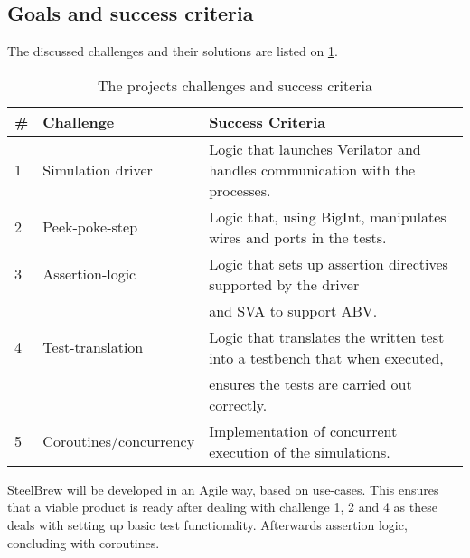 \subsection{Goals and success criteria}
The discussed challenges and their solutions are listed on \cref{tbl:criteria}.
\begin{table}[H]
    \centering
    \caption{The projects challenges and success criteria}\label{tbl:criteria}
    \begin{tabular}{lll}
        \toprule
        \# & Challenge              & Success Criteria                                                            \\
        \midrule
        1  & Simulation driver      & Logic that launches Verilator and handles communication with the processes. \\
        2  & Peek-poke-step         & Logic that, using BigInt, manipulates wires and ports in the tests.         \\
        3  & Assertion-logic        & Logic that sets up assertion directives supported by the driver             \\
           &                        & and SVA to support ABV.                                                     \\
        4  & Test-translation       & Logic that translates the written test into a testbench that when executed, \\
           &                        & ensures the tests are carried out correctly.                                \\
        5  & Coroutines/concurrency & Implementation of concurrent execution of the simulations.                  \\
        \bottomrule
    \end{tabular}
\end{table}
SteelBrew will be developed in an Agile way, based on use-cases. This ensures that a viable product is ready after dealing with challenge 1, 2 and 4 as these deals with setting up basic test functionality. Afterwards assertion logic, concluding with coroutines.